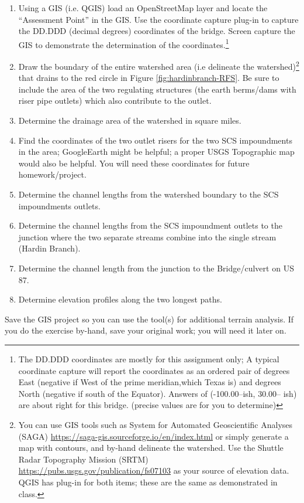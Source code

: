 \documentclass[12pt]{article}
\begin{document}
\begin{enumerate}
\item Using a GIS (i.e. QGIS) load an OpenStreetMap layer and locate the ``Assessment Point'' in the GIS.  Use the coordinate capture plug-in to capture the DD.DDD (decimal degrees) coordinates of the bridge.  Screen capture the GIS to demonstrate the determination of the coordinates.\footnote{The DD.DDD coordinates are mostly for this assignment only; A typical coordinate capture will report the coordinates as an ordered pair of degrees East (negative if West of the prime meridian,which Texas is) and degrees North (negative if south of the Equator).  Answers of (-100.00--ish, 30.00-- ish) are about right for this bridge. (precise values are for you to determine)}

\item Draw the boundary of the entire watershed area (i.e delineate the watershed)\footnote{You can use GIS tools such as System for Automated Geoscientific Analyses (SAGA) \url{https://saga-gis.sourceforge.io/en/index.html} or simply generate a map with contours, and by-hand delineate the watershed.  Use the Shuttle Radar Topography Mission (SRTM) \url{https://pubs.usgs.gov/publication/fs07103} as your source of elevation data.  QGIS has plug-in for both items; these are the same as demonstrated in class.} that drains to the red circle in Figure \ref{fig:hardinbranch-RFS}. Be sure to include the area of the two regulating structures (the earth berms/dams with riser pipe outlets) which also contribute to the outlet.

\item Determine the drainage area of the watershed in square miles.

\item Find the coordinates of the two outlet risers for the two SCS impoundments in the area; GoogleEarth might be helpful; a proper USGS Topographic map would also be helpful.  You will need these coordinates for future homework/project.

\item Determine the channel lengths from the watershed boundary to the SCS impoundments outlets.  

\item Determine the channel lengths from the SCS impoundment outlets to the junction where the two separate streams combine into the single stream (Hardin Branch).

\item Determine the channel length from the junction to the Bridge/culvert on US 87.

\item Determine elevation profiles along the two longest paths.


\end{enumerate}

Save the GIS project so you can use the tool(s) for additional terrain analysis.  If you do the exercise by-hand, save your original work; you will need it later on.
\end{document}
